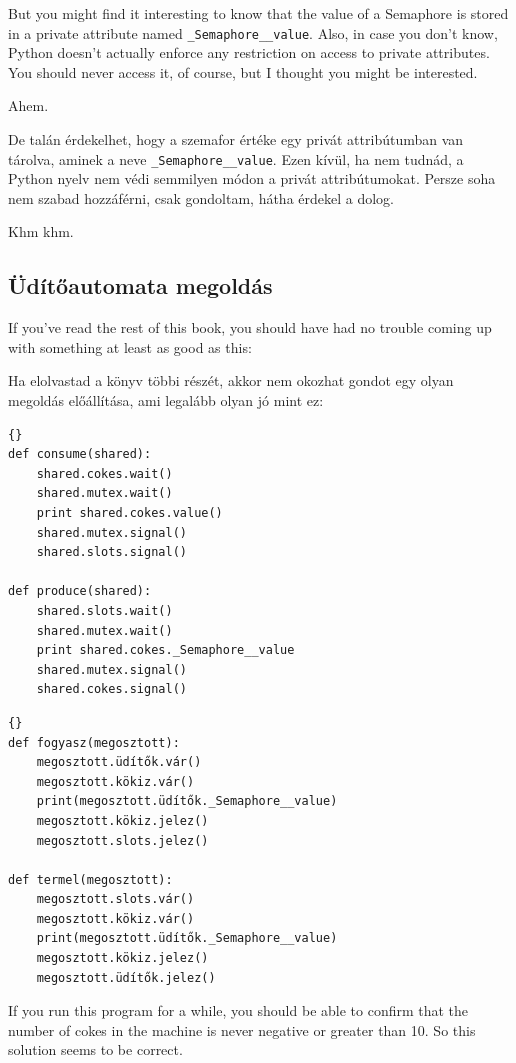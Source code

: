 \documentclass{book}
\newcommand{\clearemptydoublepage}{\newpage\cleardoublepage}
\begin{document}
But you might find it interesting to know that the value
of a Semaphore is stored in a private attribute named
{\tt \_Semaphore\_\_value}.  Also, in case you don't know,
Python doesn't actually enforce any restriction on access to
private attributes.  You should never access it, of course,
but I thought you might be interested.

Ahem.

De talán érdekelhet, hogy a szemafor értéke egy privát attribútumban
van tárolva, aminek a neve {\tt \_Semaphore\_\_value}.
Ezen kívül, ha nem tudnád, a Python nyelv nem védi
semmilyen módon a privát attribútumokat. Persze soha nem
szabad hozzáférni, csak gondoltam, hátha érdekel
a dolog.

Khm khm.


\clearemptydoublepage
\subsection{Üdítőautomata megoldás}

If you've read the rest of this book, you should have had no
trouble coming up with something at least as good as this:

Ha elolvastad a könyv többi részét, akkor nem okozhat gondot
egy olyan megoldás előállítása, ami legalább olyan jó mint ez:

\begin{lstlisting}[title={}]{}
def consume(shared):
    shared.cokes.wait()
    shared.mutex.wait()
    print shared.cokes.value()
    shared.mutex.signal()
    shared.slots.signal()

def produce(shared):
    shared.slots.wait()
    shared.mutex.wait()
    print shared.cokes._Semaphore__value
    shared.mutex.signal()
    shared.cokes.signal()
\end{lstlisting}

\begin{lstlisting}[title={Üdítőautomata megoldás}]{}
def fogyasz(megosztott):
    megosztott.üdítők.vár()
    megosztott.kökiz.vár()
    print(megosztott.üdítők._Semaphore__value)
    megosztott.kökiz.jelez()
    megosztott.slots.jelez()

def termel(megosztott):
    megosztott.slots.vár()
    megosztott.kökiz.vár()
    print(megosztott.üdítők._Semaphore__value)
    megosztott.kökiz.jelez()
    megosztott.üdítők.jelez()
\end{lstlisting}

If you run this program for a while, you should be able to confirm
that the number of cokes in the machine is never negative or greater
than 10.  So this solution seems to be correct.
\end{document}
